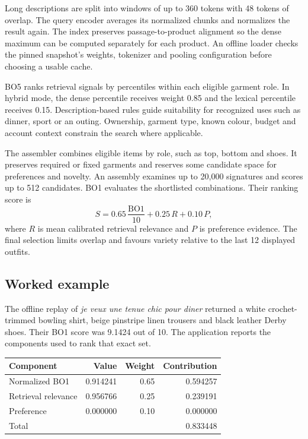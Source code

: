 \documentclass[11pt,a4paper]{article}
\begin{document}
Long descriptions are split into windows of up to 360 tokens with 48 tokens of overlap. The query encoder averages its normalized chunks and normalizes the result again. The index preserves passage-to-product alignment so the dense maximum can be computed separately for each product. An offline loader checks the pinned snapshot's weights, tokenizer and pooling configuration before choosing a usable cache.

BO5 ranks retrieval signals by percentiles within each eligible garment role. In hybrid mode, the dense percentile receives weight 0.85 and the lexical percentile receives 0.15. Description-based rules guide suitability for recognized uses such as dinner, sport or an outing. Ownership, garment type, known colour, budget and account context constrain the search where applicable.

The assembler combines eligible items by role, such as top, bottom and shoes. It preserves required or fixed garments and reserves some candidate space for preferences and novelty. An assembly examines up to 20,000 signatures and scores up to 512 candidates. BO1 evaluates the shortlisted combinations. Their ranking score is
\[
S=0.65\,\frac{\mathrm{BO1}}{10}+0.25\,R+0.10\,P,
\]
where \(R\) is mean calibrated retrieval relevance and \(P\) is preference evidence. The final selection limits overlap and favours variety relative to the last 12 displayed outfits.

\subsection*{Worked example}
The offline replay of \textit{je veux une tenue chic pour diner} returned a white crochet-trimmed bowling shirt, beige pinstripe linen trousers and black leather Derby shoes. Their BO1 score was 9.1424 out of 10. The application reports the components used to rank that exact set.

\begin{tabularx}{\linewidth}{@{}Yrrr@{}}
\toprule
\textbf{Component} & \textbf{Value} & \textbf{Weight} & \textbf{Contribution} \\
\midrule
Normalized BO1 & 0.914241 & 0.65 & 0.594257 \\
Retrieval relevance & 0.956766 & 0.25 & 0.239191 \\
Preference & 0.000000 & 0.10 & 0.000000 \\
\midrule
Total & & & 0.833448 \\
\bottomrule
\end{tabularx}
\end{document}
